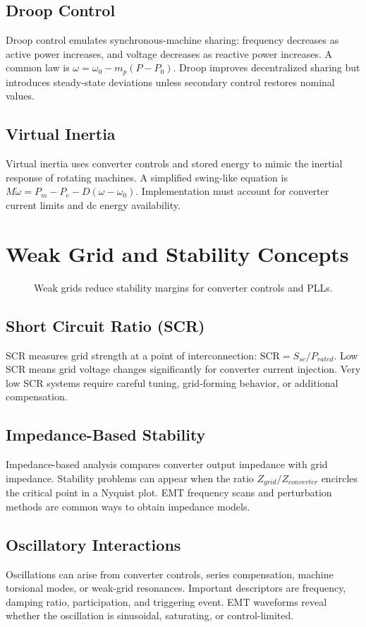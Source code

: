 \documentclass[11pt]{article}
\begin{document}
\subsection{Droop Control}
Droop control emulates synchronous-machine sharing: frequency decreases as active power increases, and voltage decreases as reactive power increases. A common law is $\omega=\omega_0-m_p(P-P_0)$. Droop improves decentralized sharing but introduces steady-state deviations unless secondary control restores nominal values.

\subsection{Virtual Inertia}
Virtual inertia uses converter controls and stored energy to mimic the inertial response of rotating machines. A simplified swing-like equation is $M\dot{\omega}=P_m-P_e-D(\omega-\omega_0)$. Implementation must account for converter current limits and dc energy availability.

\section{Weak Grid and Stability Concepts}
\begin{figure}[h]
\centering

\caption{Weak grids reduce stability margins for converter controls and PLLs.}
\end{figure}

\subsection{Short Circuit Ratio (SCR)}
SCR measures grid strength at a point of interconnection: $\mathrm{SCR}=S_{sc}/P_{rated}$. Low SCR means grid voltage changes significantly for converter current injection. Very low SCR systems require careful tuning, grid-forming behavior, or additional compensation.

\subsection{Impedance-Based Stability}
Impedance-based analysis compares converter output impedance with grid impedance. Stability problems can appear when the ratio $Z_{grid}/Z_{converter}$ encircles the critical point in a Nyquist plot. EMT frequency scans and perturbation methods are common ways to obtain impedance models.

\subsection{Oscillatory Interactions}
Oscillations can arise from converter controls, series compensation, machine torsional modes, or weak-grid resonances. Important descriptors are frequency, damping ratio, participation, and triggering event. EMT waveforms reveal whether the oscillation is sinusoidal, saturating, or control-limited.
\end{document}

